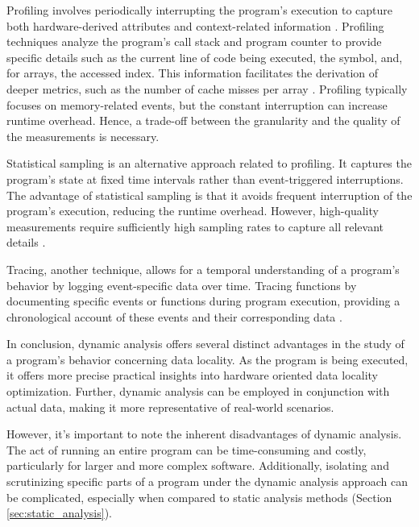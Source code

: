 Profiling involves periodically interrupting the program's execution to capture both hardware-derived attributes and context-related information \cite{itzkowitz2003memory,gimenez2017memaxes,adhianto2010hpctoolkit}. Profiling techniques analyze the program's call stack and program counter to provide specific details such as the current line of code being executed, the symbol, and, for arrays, the accessed index. This information facilitates the derivation of deeper metrics, such as the number of cache misses per array \cite{adhianto2010hpctoolkit}. Profiling typically focuses on memory-related events, but the constant interruption can increase runtime overhead. Hence, a trade-off between the granularity and the quality of the measurements is necessary.

Statistical sampling is an alternative approach related to profiling. It captures the program's state at fixed time intervals rather than event-triggered interruptions. The advantage of statistical sampling is that it avoids frequent interruption of the program's execution, reducing the runtime overhead. However, high-quality measurements require sufficiently high sampling rates to capture all relevant details \cite{adhianto2010hpctoolkit}.

Tracing, another technique, allows for a temporal understanding of a program's behavior by logging event-specific data over time. Tracing functions by documenting specific events or functions during program execution, providing a chronological account of these events and their corresponding data \cite{shende1999profiling,adhianto2010hpctoolkit,mckinley1999quantifying}.

In conclusion, dynamic analysis offers several distinct advantages in the study of a program's behavior concerning data locality. As the program is being executed, it offers more precise practical insights into hardware oriented data locality optimization. Further, dynamic analysis can be employed in conjunction with actual data, making it more representative of real-world scenarios.

However, it's important to note the inherent disadvantages of dynamic analysis. The act of running an entire program can be time-consuming and costly, particularly for larger and more complex software. Additionally, isolating and scrutinizing specific parts of a program under the dynamic analysis approach can be complicated, especially when compared to static analysis methods (Section \ref{sec:static_analysis}).

